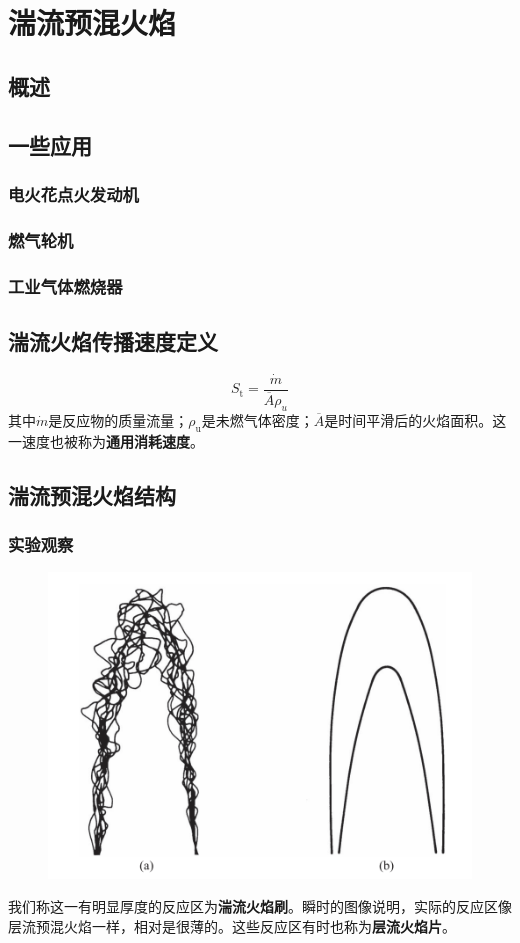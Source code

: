 \section{湍流预混火焰}
\subsection{概述}
\subsection{一些应用}
\subsubsection{电火花点火发动机}
\subsubsection{燃气轮机}
\subsubsection{工业气体燃烧器}
\subsection{湍流火焰传播速度定义}
\begin{equation}
    S_\mathrm{t} = \frac{\dot{m}}{\overline{A} \rho_u}
\end{equation}其中\(\dot{m}\)是反应物的质量流量；\(\rho_\mathrm{u}\)是未燃气体密度；\(\overline{A}\)是时间平滑后的火焰面积。这一速度也被称为\textbf{通用消耗速度}。
\subsection{湍流预混火焰结构}
\subsubsection{实验观察}
\begin{figure}[H]
    \centering
    \includegraphics[width=.3\textwidth]{img/turb_prem_image.png}
\end{figure}
我们称这一有明显厚度的反应区为\textbf{湍流火焰刷}。瞬时的图像说明，实际的反应区像层流预混火焰一样，相对是很薄的。这些反应区有时也称为\textbf{层流火焰片}。

